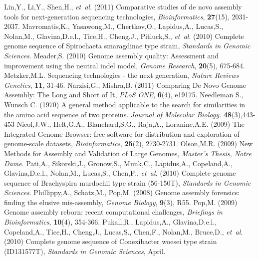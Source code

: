\documentclass[phd,tocprelim]{cornell}
\begin{document}
\begin{thebibliography}{}
 Lin,Y., Li,Y., Shen,H., {\it et~al}. (2011) Comparative studies of de novo assembly tools for next-generation sequencing technologies, {\it Bioinformatics}, {\bf 27}(15), 2031-2037.
 Mavromatis,K., Yasawong,M., Chertkov,O., Lapidus,A., Lucas,S., Nolan,M., Glavina,D.e.l., Tice,H., Cheng,J., Pitluck,S., {\it et~al}. (2010) Complete genome sequence of Spirochaeta smaragdinae type strain, {\it Standards in Genomic Sciences}.
 Meader,S. (2010) Genome assembly quality: Assessment and improvement using the neutral indel model, {\it Genome Research}, {\bf 20}(5), 675-684.
 Metzker,M.L. Sequencing technologies - the next generation, {\it Nature Reviews Genetics}, {\bf 11}, 31-46.
 Narzisi,G., Mishra,B. (2011) Comparing De Novo Genome Assembly: The Long and Short of It, {\it PLoS ONE}, {\bf 6}(4), e19175.
    Needleman S., Wunsch C. (1970) A general method applicable to the search for similarities in the amino acid sequence of two proteins.
    \textit{Journal of Molecular Biology.} \textbf{48}(3),443-453
 Nicol,J.W., Helt,G.A., Blanchard,S.G., Raja,A., Loranine,A.E. (2009) The Integrated Genome Browser: free software for distribution and exploration of genome-scale datasets, {\it Bioinformatics}, {\bf 25}(2), 2730-2731.
 Olson,M.R. (2009) New Methods for Assembly and Validation of Large Genomes, {\it Master's Thesis, Notre Dame}.
 Pati,A., Sikorski,J., Gronow,S., Munk,C., Lapidus,A., Copeland,A., Glavina,D.e.l., Nolan,M., Lucas,S., Chen,F., {\it et~al}. (2010) Complete genome sequence of Brachyspira murdochii type strain (56-150T), {\it Standards in Genomic Sciences}.
 Phillippy,A., Schatz,M., Pop,M. (2008) Genome assembly forensics: finding the elusive mis-assembly, {\it Genome Biology}, {\bf 9}(3), R55.
 Pop,M. (2009) Genome assembly reborn: recent computational challenges, {\it Briefings in Bioinformatics}, {\bf 10}(4), 354-366.
 Pukall,R., Lapidus,A., Glavina,D.e.l., Copeland,A., Tice,H., Cheng,J., Lucas,S., Chen,F., Nolan,M., Bruce,D., {\it et~al}. (2010) Complete genome sequence of Conexibacter woesei type strain (ID131577T), {\it Standards in Genomic Sciences}, April.

\end{thebibliography}
\end{document}
